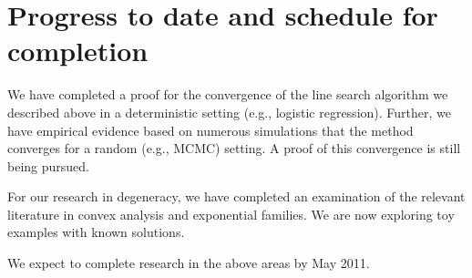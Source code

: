 \documentclass[12pt]{article}
\begin{document}





\section{Progress to date and schedule for completion}
We have completed a proof for the convergence of the line search algorithm we described above in a deterministic setting (e.g., logistic regression).  Further, we have empirical evidence based on numerous simulations that the method converges for a random (e.g., MCMC) setting.  A proof of this convergence is still being pursued.  

For our research in degeneracy, we have completed an examination of the relevant literature in convex analysis and exponential families.  We are now exploring toy examples with known solutions.  

We expect to complete research in the above areas by May 2011.

\newpage




%

%


%

% 
\end{document}
